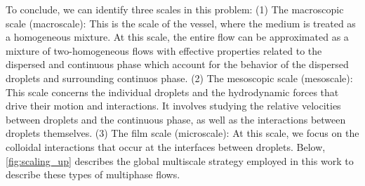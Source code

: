 To conclude, we can identify three scales in this problem:
(1) The macroscopic scale (macroscale): This is the scale of the vessel, where the medium is treated as a homogeneous mixture. 
At this scale, the entire flow can be approximated as a mixture of two-homogeneous flows with effective properties related to the dispersed and continuous phase which account for the behavior of the dispersed droplets and surrounding continuos phase.
(2) The mesoscopic scale (mesoscale): This scale concerns the individual droplets and the hydrodynamic forces that drive their motion and interactions. It involves studying the relative velocities between droplets and the continuous phase, as well as the interactions between droplets themselves.
(3) The film scale (microscale): At this scale, we focus on the colloidal interactions that occur at the interfaces between droplets. 
Below, \ref{fig:scaling_up} describes the global multiscale strategy employed in this work to describe these types of multiphase flows.
